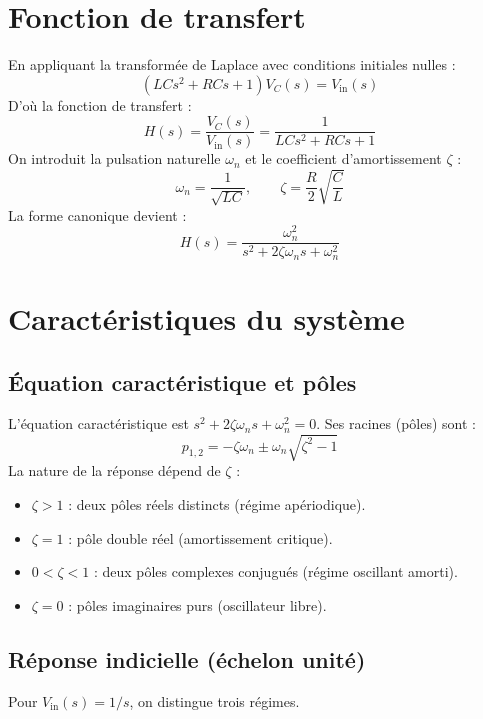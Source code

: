 \documentclass[12pt,a4paper]{article}
\begin{document}
	\section{Fonction de transfert}
	En appliquant la transformée de Laplace avec conditions initiales nulles :
	\begin{equation}
	(LC s^2 + RC s + 1) V_C(s) = V_{\text{in}}(s)
	\end{equation}
	D'où la fonction de transfert :
	\begin{equation}
	H(s) = \frac{V_C(s)}{V_{\text{in}}(s)} = \frac{1}{LC s^2 + RC s + 1}
	\end{equation}
	On introduit la pulsation naturelle $\omega_n$ et le coefficient d'amortissement $\zeta$ :
	\begin{equation}
	\omega_n = \frac{1}{\sqrt{LC}}, \qquad \zeta = \frac{R}{2}\sqrt{\frac{C}{L}}
	\end{equation}
	La forme canonique devient :
	\begin{equation}
	H(s) = \frac{\omega_n^2}{s^2 + 2\zeta\omega_n s + \omega_n^2}
	\end{equation}
	
	\section{Caractéristiques du système}
	
	\subsection{Équation caractéristique et pôles}
	L'équation caractéristique est $s^2 + 2\zeta\omega_n s + \omega_n^2 = 0$. Ses racines (pôles) sont :
	\begin{equation}
	p_{1,2} = -\zeta\omega_n \pm \omega_n \sqrt{\zeta^2 - 1}
	\end{equation}
	La nature de la réponse dépend de $\zeta$ :
	\begin{itemize}
		\item $\zeta > 1$ : deux pôles réels distincts (régime apériodique).
		\item $\zeta = 1$ : pôle double réel (amortissement critique).
		\item $0 < \zeta < 1$ : deux pôles complexes conjugués (régime oscillant amorti).
		\item $\zeta = 0$ : pôles imaginaires purs (oscillateur libre).
	\end{itemize}
	
	\subsection{Réponse indicielle (échelon unité)}
	Pour $V_{\text{in}}(s) = 1/s$, on distingue trois régimes.
	
\end{document}
